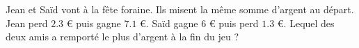 
\begin{exercice}\label{exo2smath-0218}

Jean et Saïd vont à la fête foraine. Ils misent la même somme d'argent au départ.  Jean perd $2.3$ € puis gagne $7.1$ €. Saïd gagne $6$ € puis perd $1.3$ €. Lequel des deux amis a remporté le plus d'argent à la fin du jeu ?


\end{exercice}
